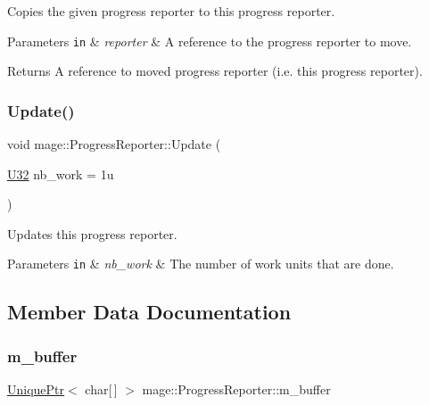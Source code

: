Copies the given progress reporter to this progress reporter.


\begin{DoxyParams}[1]{Parameters}
\mbox{\tt in}  & {\em reporter} & A reference to the progress reporter to move. \\
\hline
\end{DoxyParams}
\begin{DoxyReturn}{Returns}
A reference to moved progress reporter (i.\+e. this progress reporter). 
\end{DoxyReturn}
\hypertarget{classmage_1_1_progress_reporter_aee55b3ced46f7512634b0443ff9807f5}{}\label{classmage_1_1_progress_reporter_aee55b3ced46f7512634b0443ff9807f5} 
\subsubsection{\texorpdfstring{Update()}{Update()}}
{\footnotesize\ttfamily void mage\+::\+Progress\+Reporter\+::\+Update (\begin{DoxyParamCaption}\item[{\hyperlink{namespacemage_a41c104c036fba3756a74e19f793eeaa1}{U32}}]{nb\+\_\+work = {\ttfamily 1u} }\end{DoxyParamCaption})}

Updates this progress reporter.


\begin{DoxyParams}[1]{Parameters}
\mbox{\tt in}  & {\em nb\+\_\+work} & The number of work units that are done. \\
\hline
\end{DoxyParams}


\subsection{Member Data Documentation}
\hypertarget{classmage_1_1_progress_reporter_ad05a4425246e206f867d54939eeb751b}{}\label{classmage_1_1_progress_reporter_ad05a4425246e206f867d54939eeb751b} 
\subsubsection{\texorpdfstring{m\+\_\+buffer}{m\_buffer}}
{\footnotesize\ttfamily \hyperlink{namespacemage_a3316d7143a973e37adf1110f2e80ca31}{Unique\+Ptr}$<$ char\mbox{[}$\,$\mbox{]} $>$ mage\+::\+Progress\+Reporter\+::m\+\_\+buffer\hspace{0.3cm}{\ttfamily [private]}}

